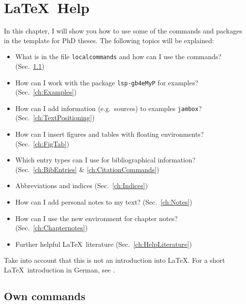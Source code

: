 \chapter{\LaTeX\ Help}
\label{ch:Help}


In this chapter, I will show you how to use some of the commands and packages in the template for PhD theses. The following topics will be explained:

\begin{itemize}
	\item What is in the file \texttt{localcommands} and how can I use the commands? (Sec.~\ref{ch:Commands})
	
	\item How can I work with the package \texttt{lsp-gb4eMyP} for examples? (Sec.~\ref{ch:Examples})
	
	\item How can I add information (e.g.\ sources) to examples \texttt{jambox}? (Sec.~\ref{ch:TextPositioning})
		
	\item How can I insert figures and tables with floating environments? (Sec.~\ref{ch:FigTab})
	
	\item Which entry types can I use for bibliographical information? (Sec.~\ref{ch:BibEntries} \& \ref{ch:CitationCommands})
		
	\item Abbreviations and indices (Sec.~\ref{ch:Indices})

	\item How can I add personal notes to my text? (Sec.~\ref{ch:Notes})

	\item How can I use the new environment for chapter notes? (Sec.~\ref{ch:Chapternotes})	

	\item Further helpful \LaTeX\ literature (Sec.~\ref{ch:HelpLiterature})
\end{itemize}


Take into account that this is not an introduction into \LaTeX . For a short \LaTeX\  introduction in German, see \citet{Freitag&MyP15a}.


\section{Own commands}
\label{ch:Commands}

